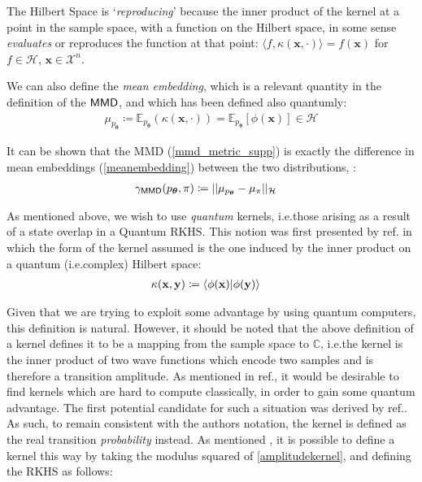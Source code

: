 The Hilbert Space is `\emph{reproducing}' because the inner product of the kernel at a point in the sample space, with a function on the Hilbert space, in some sense \emph{evaluates} or reproduces the function at that point:  $\langle f, \kappa(\mathbf{x}, \cdot)\rangle  = f(\mathbf{x})$ for $f \in \mathcal{H}$, 
$\mathbf{x} \in \mathcal{X}^n$. 

We can also define the \emph{mean embedding}, which is a relevant quantity in the definition of the $\operatorname{\textsf{MMD}}$, and which has been defined also quantumly:
\begin{align}
    \mu_{p_{\boldsymbol\theta}}  \coloneqq \mathbb{E}_{p_{\boldsymbol\theta}}(\kappa(\mathbf{x}, \cdot)) =\mathbb{E}_{p_{\boldsymbol\theta}}[\phi(\mathbf{x})] \in \mathcal{H} \label{meanembedding}
\end{align}

It can be shown that the \textsf{MMD} (\eqref{mmd_metric_supp}) is exactly the difference in mean embeddings (\eqref{meanembedding}) between the two distributions, :
\begin{align}
    \gamma_{\operatorname{\textsf{MMD}}}(p_{\boldsymbol\theta}, \pi) &  \coloneqq ||\mu_{p_{\boldsymbol\theta}} - \mu_{\pi}||_{\mathcal{H}}\label{mmd_mean_embedding}
\end{align}

As mentioned above, we wish to use \emph{quantum} kernels, i.e.\@ those arising as a result of a state overlap in a Quantum RKHS. This notion was first presented by ref.  in which the form of the kernel assumed is the one induced by the inner product on a quantum (i.e.\@ complex) Hilbert space:
\begin{align}
\kappa(\mathbf{x}, \mathbf{y}) & \coloneqq \braket{\phi(\mathbf{x})|\phi(\mathbf{y})} \label{amplitudekernel}
\end{align}

Given that we are trying to exploit some advantage by using quantum computers, this definition is natural. However, it should be noted that the above definition of a kernel defines it to be a mapping from the sample space to $\mathbb{C}$, i.e.\@ the kernel is the inner product of two wave functions which encode two samples and is therefore a transition amplitude. As mentioned in ref., it would be desirable to find kernels which are hard to compute classically, in order to gain some quantum advantage. The first potential candidate for such a situation was derived by ref.. As such, to remain consistent with the authors notation, the kernel is defined as the real transition \emph{probability} instead. As mentioned , it is possible to define a kernel this way by taking the modulus squared of \eqref{amplitudekernel}, and defining the RKHS as follows:

